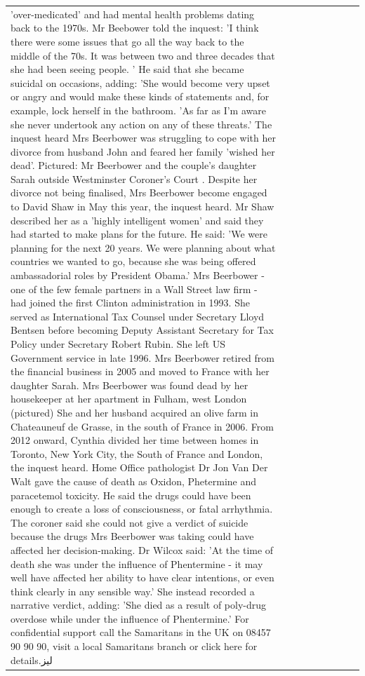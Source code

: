 \begin{table}[H]
\begin{tabular}{lllrlllll}
'over-medicated' and had mental health problems dating back to the 1970s. Mr Beebower told the inquest: 'I think there were some issues that go all the way back to the middle of the 70s. It was between two and three decades that she had been seeing people. ' He said that she became suicidal on occasions, adding: 'She would become very upset or angry and would make these kinds of statements and, for example, lock herself in the bathroom. 'As far as I'm aware she never undertook any action on any of these threats.' The inquest heard Mrs Beerbower was struggling to cope with her divorce from husband John and feared her family 'wished her dead'. Pictured: Mr Beerbower and the couple's daughter Sarah outside Westminster Coroner's Court . Despite her divorce not being finalised, Mrs Beerbower become engaged to David Shaw in May this year, the inquest heard. Mr Shaw described her as a 'highly intelligent women' and said they had started to make plans for the future. He said: 'We were planning for the next 20 years. We were planning about what countries we wanted to go, because she was being offered ambassadorial roles by President Obama.' Mrs Beerbower - one of the few female partners in a Wall Street law firm - had joined the first Clinton administration in 1993. She served as International Tax Counsel under Secretary Lloyd Bentsen before becoming Deputy Assistant Secretary for Tax Policy under Secretary Robert Rubin. She left US Government service in late 1996. Mrs Beerbower retired from the financial business in 2005 and moved to France with her daughter Sarah. Mrs Beerbower was found dead by her housekeeper at her apartment in Fulham, west London (pictured) She and her husband acquired an olive farm in Chateauneuf de Grasse, in the south of France in 2006. From 2012 onward, Cynthia divided her time between homes in Toronto, New York City, the South of France and London, the inquest heard. Home Office pathologist Dr Jon Van Der Walt gave the cause of death as Oxidon, Phetermine and paracetemol toxicity. He said the drugs could have been enough to create a loss of consciousness, or fatal arrhythmia. The coroner said she could not give a verdict of suicide because the drugs Mrs Beerbower was taking could have affected her decision-making. Dr Wilcox said: 'At the time of death she was under the influence of Phentermine - it may well have affected her ability to have clear intentions, or even think clearly in any sensible way.' She instead recorded a narrative verdict, adding: 'She died as a result of poly-drug overdose while under the influence of Phentermine.' For confidential support call the Samaritans in the UK on 08457 90 90 90, visit a local Samaritans branch or click here for details.ليز \\

\end{tabular}
\end{table}
